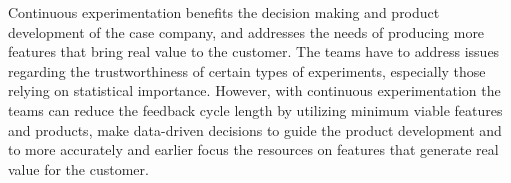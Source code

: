 \documentclass[english, grading]{tktltiki2}
\theoremstyle{definition}
\theoremstyle{remark}
\begin{document}
Continuous experimentation benefits the decision making and product development of the case company, and addresses the needs of producing more features that bring real value to the customer. The teams have to address issues regarding the trustworthiness of certain types of experiments, especially those relying on statistical importance. However, with continuous experimentation the teams can reduce the feedback cycle length by utilizing minimum viable features and products, make data-driven decisions to guide the product development and to more accurately and earlier focus the resources on features that generate real value for the customer.
% 











\end{document}
